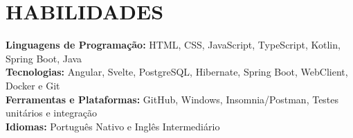 
          

\section{HABILIDADES}
\begin{itemize}[leftmargin=0in, label={}]
	\small{\item{
		\textbf{Linguagens de Programação:}
		{HTML, CSS, JavaScript, TypeScript, Kotlin, Spring Boot, Java }
		\vspace{2pt} \\
				
		\textbf{Tecnologias:}
		{Angular, Svelte, PostgreSQL, Hibernate, Spring Boot, WebClient, Docker e Git}
		\vspace{2pt} \\
						     
		\textbf{Ferramentas e Plataformas:}
		{GitHub, Windows, Insomnia/Postman, Testes unitários e integração }
		\vspace{2pt} \\
						     
		\textbf{Idiomas:}
		{Português Nativo e Inglês Intermediário}
	}}
\end{itemize}